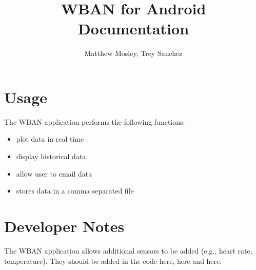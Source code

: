 \documentclass{article}
\author{Matthew Mosley, Trey Sanchez}
\title{WBAN for Android Documentation}
\begin{document}
\maketitle

\section{Usage}
The WBAN application performs the following functions:

\begin{itemize}
\item plot data in real time
\item display historical data
\item allow user to email data
\item stores data in a comma separated file
\end{itemize}


\section{Developer Notes}
The WBAN application allows additional sensors to be added (e.g., heart rate, temperature). They should be added in
the code here, here and here.
\end{document}

